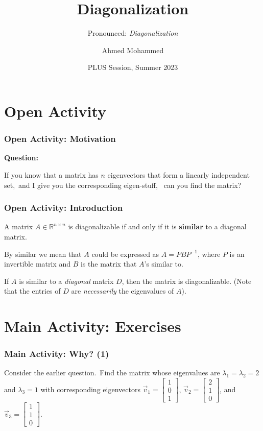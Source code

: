 \documentclass{beamer}
\title{Diagonalization}
\subtitle{Pronounced: \textit{Di\pro{}a\pro{}go\pro{}na\pro{}li\pro{}za\pro{}tion}}
\author{Ahmed Mohammed}
\institute{Georgia Institute of Technology}
\date{PLUS Session, Summer 2023}
\begin{document}
	\begin{frame}
		\maketitle
	\end{frame}

	\section{Open Activity}
	\begin{frame}
		\frametitle{Open Activity: Motivation}
		\textbf{Question:} \pause
		\begin{center}
			If you know that a matrix has \(n\) eigenvectors that form a linearly independent set,\pause \ and I give you the corresponding eigen-stuff,\pause
			\ can you find the matrix?
		\end{center}
	\end{frame}

	\begin{frame}
		\frametitle{Open Activity: Introduction}
		\begin{definition}
			A matrix \(A \in \mathbb{R}^{n \times n}\) is diagonalizable if and only if it is \textbf{similar} to a diagonal matrix.
		\end{definition}
		
		By similar we mean that \(A\) could be expressed as \(A = PBP^{-1}\), where \(P\) is an invertible matrix and \(B\) is the matrix that \(A\)'s similar to.
		\pause

		If \(A\) is similar to a \emph{diagonal} matrix \(D\), then the matrix is diagonalizable. (Note that the entries of \(D\) are \emph{necessarily} the
		eigenvalues of \(A\)).
	\end{frame}

	\section{Main Activity: Exercises}
		\begin{frame}
			\frametitle{Main Activity: Why? (1)}

			Consider the earlier question.\pause\  Find the matrix whose eigenvalues are \(\lambda_1 = \lambda_2 = 2\) and \(\lambda_3 = 1\) with 
			corresponding eigenvectors \(\vec{v}_1 = \begin{bmatrix}1 \\ 0 \\ 1\end{bmatrix}\), \(\vec{v}_2 = \begin{bmatrix}2 \\ 1 \\ 0\end{bmatrix}\), 
			and \(\vec{v}_3 = \begin{bmatrix}1 \\ 1 \\ 0\end{bmatrix}\).
		\end{frame}
		
\end{document}
